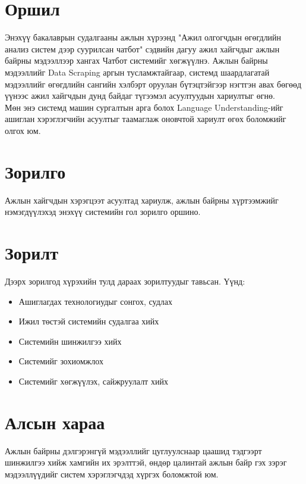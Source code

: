 \section{Оршил}
\quad Энэхүү бакалаврын судалгааны ажлын хүрээнд "Ажил олгогчдын өгөгдлийн анализ систем дээр суурилсан чатбот" сэдвийн дагуу ажил хайгчдыг ажлын байрны мэдээллээр хангах Чатбот системийг хөгжүүлнэ. Ажлын байрны мэдээллийг Data Scraping аргын тусламжтайгаар, системд шаардлагатай мэдээллийг өгөгдлийн сангийн хэлбэрт оруулан бүтэцтэйгээр нэгтгэн авах бөгөөд үүнээс ажил хайгчдын дунд байдаг түгээмэл асуултуудын хариултыг өгнө.
\\Мөн энэ системд машин сургалтын арга болох Language Understanding-ийг ашиглан хэрэглэгчийн асуултыг таамаглаж оновчтой хариулт өгөх боломжийг олгох юм. 
\section{Зорилго}
\quad Ажлын хайгчдын хэрэгцээт асуултад хариулж, ажлын байрны хүртээмжийг нэмэгдүүлэхэд энэхүү системийн гол зорилго оршино.
\section{Зорилт}
\quad Дээрх зорилгод хүрэхийн тулд дараах зорилтуудыг тавьсан. Үүнд:
\begin{itemize}
	\item Ашиглагдах технологиудыг сонгох, судлах
	\item Ижил төстэй системийн судалгаа хийх
	\item Системийн шинжилгээ хийх
	\item Системийг зохиомжлох
	\item Системийг хөгжүүлэх, сайжруулалт хийх
\end{itemize}
\section{Алсын хараа}
\quad Ажлын байрны дэлгэрэнгүй мэдээллийг цуглуулснаар цаашид тэдгээрт шинжилгээ хийж хамгийн их эрэлттэй, өндөр цалинтай ажлын байр гэх зэрэг мэдээллүүдийг систем хэрэглэгчдэд хүргэх боломжтой юм. 